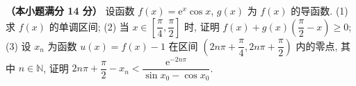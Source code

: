 \begin{question}
\textbf{（本小题满分 14 分）} 
设函数 $f(x) = \mathrm{e}^x \cos x$, $g(x)$ 为 $f(x)$ 的导函数.
(1) 求 $f(x)$ 的单调区间;
(2) 当 $x \in \left[\dfrac{\pi}{4}, \dfrac{\pi}{2}\right]$ 时, 证明 $f(x) + g(x)\left(\dfrac{\pi}{2} - x\right) \geqslant 0$;
(3) 设 $x_n$ 为函数 $u(x) = f(x) - 1$ 在区间 $\left(2n\pi + \dfrac{\pi}{4}, 2n\pi + \dfrac{\pi}{2}\right)$ 内的零点, 其中 $n \in \mathbb{N}$, 证明 $2n\pi + \dfrac{\pi}{2} - x_n < \dfrac{\mathrm{e}^{-2n\pi}}{\sin x_0 - \cos x_0}$.

\end{question}
